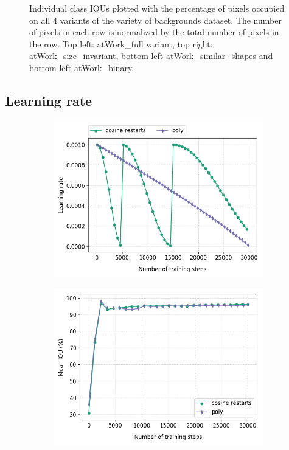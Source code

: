 \begin{figure}[!htb]
\begin{subfigure}{.5\textwidth}
		\end{subfigure}
		\caption{Individual class IOUs plotted with the percentage of pixels occupied on all 4 variants of the variety of backgrounds dataset. The number of pixels in each row is normalized by the total number of pixels in the row. Top left: atWork\_full variant, top right: atWork\_size\_invariant, bottom left atWork\_similar\_shapes and bottom left atWork\_binary.}
		\label{Fig:clsiou}
	\end{figure}

\subsection{Learning rate}

	\begin{figure}[!htb]
		\begin{subfigure}{.3\textwidth}
			\centering
			\includegraphics[width=1\linewidth]{images/lr_train_bin}
		\end{subfigure}
		\begin{subfigure}{.3\textwidth}
			\centering
			\includegraphics[width=1\linewidth]{images/lr_binary}

\end{subfigure}
\end{figure}

